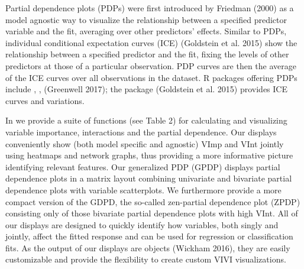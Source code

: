 Partial dependence plots (PDPs) were first introduced by Friedman (2000) as
a model agnostic way to visualize the relationship between a specified
predictor variable and the fit, averaging over other predictors'
effects. Similar to PDPs, individual conditional expectation curves (ICE)
(Goldstein et al. 2015) show the relationship between a specified predictor and the
fit, fixing the levels of other predictors at those of a particular
observation. PDP curves are then the average of the ICE curves over all
observations in the dataset. R packages offering PDPs include
, ,  (Greenwell 2017);
the package  (Goldstein et al. 2015) provides ICE curves and variations.

In  we provide a suite of functions (see Table 2) for calculating and visualizing variable importance, interactions and the partial dependence. Our displays conveniently show
(both model specific and agnostic) VImp and VInt jointly using heatmaps and network graphs, thus providing a more informative picture identifying relevant features. Our generalized PDP (GPDP) displays partial dependence plots in a matrix layout combining univariate and bivariate partial dependence plots with variable scatterplots. We furthermore provide a more compact version of the GDPD, the so-called zen-partial dependence plot (ZPDP) consisting only of those bivariate partial dependence plots with high VInt. All of our displays are designed to quickly identify how variables, both singly and jointly, affect the fitted response and can be used for regression or classification fits. As the output of our displays are  objects (Wickham 2016), they are easily customizable and provide the flexibility to create custom VIVI visualizations.

